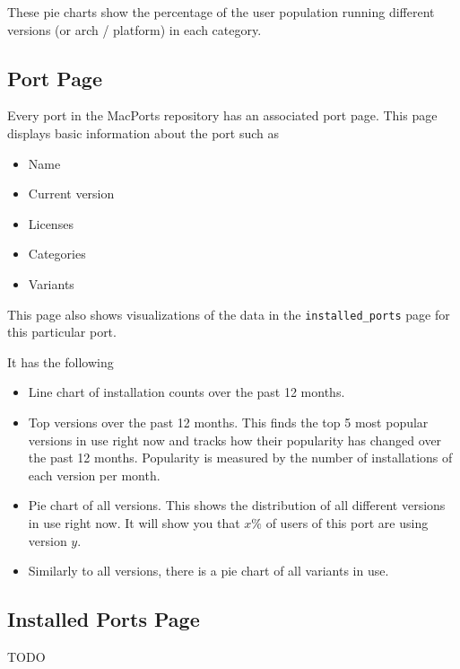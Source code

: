 \documentclass[10pt]{article}
\begin{document}
These pie charts show the percentage of the user population running different versions (or arch / platform) in each category.

\subsection{Port Page}

Every port in the MacPorts repository has an associated port page. This page displays basic information about the port such as
\begin{itemize}
  \item Name
  \item Current version
  \item Licenses
  \item Categories
  \item Variants
\end{itemize}

This page also shows visualizations of the data in the \texttt{installed\_ports} page for this particular port.

It has the following
\begin{itemize}
  \item Line chart of installation counts over the past 12 months.
  \item Top versions over the past 12 months. This finds the top 5 most popular versions in use right now and tracks how their popularity has changed over the past 12 months. Popularity is measured by the number of installations of each version per month.
  \item Pie chart of all versions. This shows the distribution of all different versions in use right now. It will show you that \(x\%\) of users of this port are using version \(y\).
  \item Similarly to all versions, there is a pie chart of all variants in use.
\end{itemize}

\subsection{Installed Ports Page}

TODO
\end{document}
